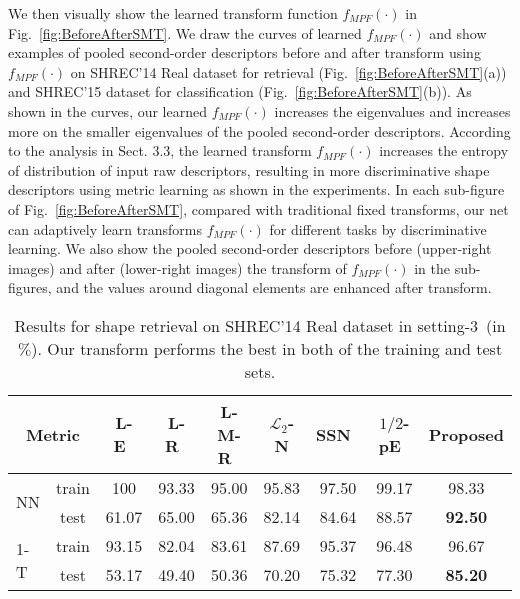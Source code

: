 \documentclass[runningheads]{llncs}
\begin{document}
We then visually show the learned transform function $f_{MPF}(\cdot)$ in  Fig.~\ref{fig:BeforeAfterSMT}. We draw the curves of learned  $f_{MPF}(\cdot)$  and show examples of pooled second-order  descriptors before and after transform using  $f_{MPF}(\cdot)$ on SHREC'14 Real dataset  for retrieval (Fig.~\ref{fig:BeforeAfterSMT}(a)) and  SHREC'15 dataset  for classification (Fig.~\ref{fig:BeforeAfterSMT}(b)). 
As shown in the curves, our learned $f_{MPF}(\cdot)$ increases the eigenvalues and increases more on the smaller eigenvalues of the pooled second-order descriptors. According to the analysis in Sect. 3.3, the learned transform  $f_{MPF}(\cdot)$ increases the entropy of distribution of input raw descriptors, resulting in more discriminative shape descriptors using metric learning as shown in the experiments. 
In each sub-figure of Fig.~\ref{fig:BeforeAfterSMT}, compared with traditional fixed transforms, our net can adaptively learn transforms $f_{MPF}(\cdot)$ for different tasks by discriminative learning. We also show the pooled second-order descriptors before (upper-right images) and after (lower-right images) the transform of $f_{MPF}(\cdot)$ in the sub-figures, and the values around diagonal elements  are enhanced after transform. 

\begin{table}[t]
\caption{Results for shape retrieval on SHREC'14 Real dataset in setting-3~(in $\%$). Our transform performs the best in both of the training and test sets.}
\newcommand{\tabincell}[2]{\begin{tabular}{@{}#1@{}}#2\end{tabular}}
\begin{center}
\begin{tabular}{|l|  c||  c|  c|   c|  c|   c|    c|  c|}
\hline
\multicolumn{2}{|c||}{Metric}    &L-E~\cite{dryden2009non-euclidean}  & L-R~\cite{Catalin2}   & L-M-R~\cite{huang2016a}  & $\mathcal{L}_2$-N  & SSN~\cite{Tsungyu}   &  $1/2$-pE~\cite{dryden2009non-euclidean}  & Proposed   \\
\hline
\multirow{2}{*}{NN} & train & 100   & 93.33 & 95.00 & 95.83 & 97.50 & 99.17 & 98.33  \\
\cline{2-2} & test          & 61.07 & 65.00 & 65.36 & 82.14 & 84.64 & 88.57 & \textbf{92.50}  \\
\hline
\multirow{2}{*}{1-T} &train & 93.15 & 82.04 & 83.61 & 87.69 & 95.37 & 96.48 &  96.67 \\
\cline{2-2} & test          & 53.17 & 49.40 & 50.36 & 70.20 & 75.32 & 77.30 &  \textbf{85.20} \\
\hline
\end{tabular}
\end{center}
\label{tab:tab4}
\end{table}
\end{document}
